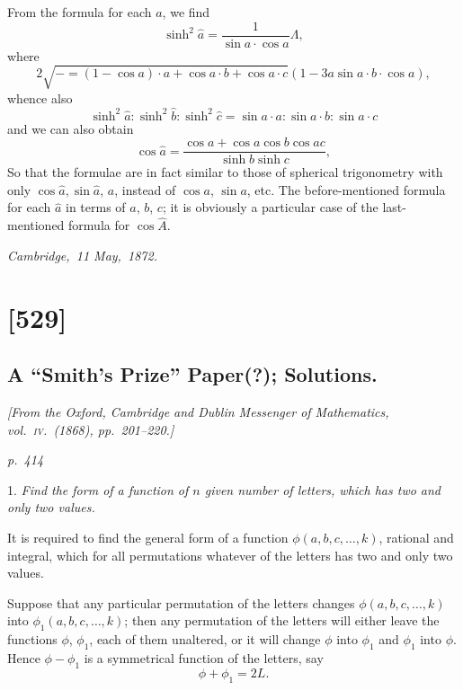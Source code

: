 \documentclass[11pt,a4paper]{book}
\begin{document}
From the formula for each $a$, we find
\[
\sinh^2 \hat{a} = \frac{1}{\sin a \cdot \cos a} \Lambda,
\]
where
\[
2\sqrt{- = (1 - \cos a) \cdot a + \cos a \cdot b + \cos a \cdot c}(1 - 3 a \sin a \cdot b \cdot \cos a),
\]
whence also
\[
\sinh^2 \hat{a} : \sinh^2 \hat{b} : \sinh^2 \hat{c} = \sin a \cdot a : \sin a \cdot b : \sin a \cdot c
\]
and we can also obtain
\[
\cos \hat{a} = \frac{\cos a + \cos a \cos b \cos a c}{\sinh b \sinh c},
\]
So that the formulae are in fact similar to those of spherical trigonometry with only
$\cos \hat{a}, \sin \hat{a}$, $a$, instead of $\cos a$, $\sin a$, etc.  The before-mentioned formula for each $\hat{a}$ in
terms of $a$, $b$, $c$; it is obviously a particular case of the last-mentioned formula for $\cos \hat{A}$.

\noindent\textit{Cambridge,\ 11 May,\ 1872.}

\clearpage

\section{[529]}
\subsection{A ``Smith's Prize'' Paper(?); Solutions.}

\begin{center}
\textit{[From the Oxford, Cambridge and Dublin Messenger of Mathematics, vol.~\textsc{iv}.\ (1868), pp.\ 201--220.]}
\end{center}

\textit{p.~414}

\noindent
\textsc{1.}  \textit{Find the form of a function of $n$ given number of letters, which has two and only two values.}

It is required to find the general form of a function $\phi(a, b, c, \ldots, k)$, rational and
integral, which for all permutations whatever of the letters has two and only two values.

Suppose that any particular permutation of the letters changes $\phi(a, b, c, \ldots, k)$ into
$\phi_1(a, b, c, \ldots, k)$; then any permutation of the letters will either leave the functions
$\phi$, $\phi_1$, each of them unaltered, or it will change $\phi$ into $\phi_1$ and $\phi_1$ into $\phi$. Hence
$\phi - \phi_1$ is a symmetrical function of the letters, say
\[
\phi + \phi_1 = 2L.
\]
\end{document}
